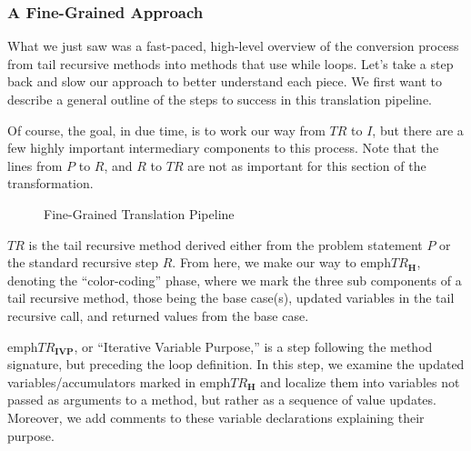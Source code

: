 \subsubsection*{A Fine-Grained Approach}
What we just saw was a fast-paced, high-level overview of the conversion process from tail recursive methods into methods that use while loops. Let’s take a step back and slow our approach to better understand each piece. We first want to describe a general outline of the steps to success in this translation pipeline. 

Of course, the goal, in due time, is to work our way from $TR$ to $I$, but there are a few highly important intermediary components to this process. Note that the lines from $P$ to $R$, and $R$ to $TR$ are not as important for this section of the transformation.

\begin{figure}[h!]
\centering
{}
\caption{Fine-Grained Translation Pipeline}
\end{figure}

$TR$ is the tail recursive method derived either from the problem statement $P$ or the standard recursive step $R$. From here, we make our way to emph{$TR_\mathbf{H}$}, denoting the ``color-coding'' phase, where we mark the three sub components of a tail recursive method, those being the base case(s), updated variables in the tail recursive call, and returned values from the base case. 

emph{$TR_\mathbf{IVP}$}, or ``Iterative Variable Purpose,'' is a step following the method signature, but preceding the loop definition. In this step, we examine the updated variables/accumulators marked in emph{$TR_\mathbf{H}$} and localize them into variables not passed as arguments to a method, but rather as a sequence of value updates. Moreover, we add comments to these variable declarations explaining their purpose.

